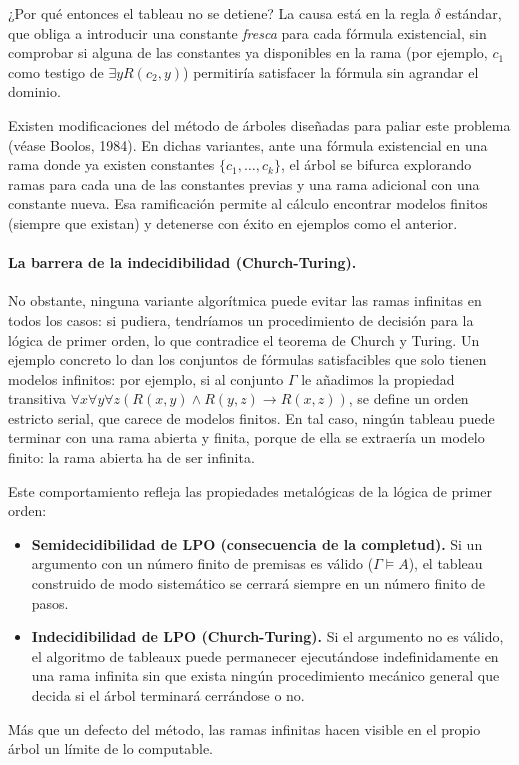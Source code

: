 ¿Por qué entonces el tableau no se detiene? La causa está en la regla $\delta$ estándar, que obliga a introducir una constante \emph{fresca} para cada fórmula existencial, sin comprobar si alguna de las constantes ya disponibles en la rama (por ejemplo, $c_1$ como testigo de $\exists y R(c_2, y)$) permitiría satisfacer la fórmula sin agrandar el dominio.

Existen modificaciones del método de árboles diseñadas para paliar este problema (véase Boolos, 1984). En dichas variantes, ante una fórmula existencial en una rama donde ya existen constantes $\{c_1, \dots, c_k\}$, el árbol se bifurca explorando ramas para cada una de las constantes previas y una rama adicional con una constante nueva. Esa ramificación permite al cálculo encontrar modelos finitos (siempre que existan) y detenerse con éxito en ejemplos como el anterior.


\paragraph{La barrera de la indecidibilidad (Church-Turing).}
No obstante, ninguna variante algorítmica puede evitar las ramas infinitas en todos los casos: si pudiera, tendríamos un procedimiento de decisión para la lógica de primer orden, lo que contradice el teorema de Church y Turing. Un ejemplo concreto lo dan los conjuntos de fórmulas satisfacibles que solo tienen modelos infinitos: por ejemplo, si al conjunto $\Gamma$ le añadimos la propiedad transitiva $\forall x \forall y \forall z (R(x, y) \land R(y, z) \to R(x, z))$, se define un orden estricto serial, que carece de modelos finitos. En tal caso, ningún tableau puede terminar con una rama abierta y finita, porque de ella se extraería un modelo finito: la rama abierta ha de ser infinita.

Este comportamiento refleja las propiedades metalógicas de la lógica de primer orden:
\begin{itemize}
    \item \textbf{Semidecidibilidad de LPO (consecuencia de la completud).} Si un argumento con un número finito de premisas es válido ($\Gamma \models A$), el tableau construido de modo sistemático se cerrará siempre en un número finito de pasos.
    \item \textbf{Indecidibilidad de LPO (Church-Turing).} Si el argumento no es válido, el algoritmo de tableaux puede permanecer ejecutándose indefinidamente en una rama infinita sin que exista ningún procedimiento mecánico general que decida si el árbol terminará cerrándose o no.
\end{itemize}
Más que un defecto del método, las ramas infinitas hacen visible en el propio árbol un límite de lo computable.

